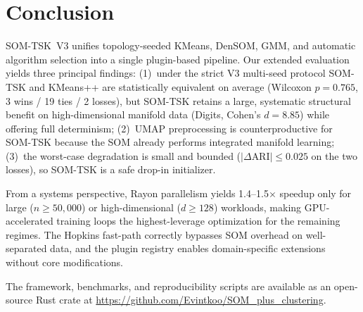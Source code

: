 \documentclass[journal]{IEEEtran}
\begin{document}
\section{Conclusion}
\label{sec:conclusion}

SOM-TSK~V3 unifies topology-seeded KMeans, DenSOM, GMM, and automatic algorithm selection into a single plugin-based pipeline.
Our extended evaluation yields three principal findings:
(1)~under the strict V3 multi-seed protocol SOM-TSK and KMeans++ are statistically equivalent on average (Wilcoxon $p = 0.765$, 3 wins / 19 ties / 2 losses), but SOM-TSK retains a large, systematic structural benefit on high-dimensional manifold data (Digits, Cohen's $d = 8.85$) while offering full determinism;
(2)~UMAP preprocessing is counterproductive for SOM-TSK because the SOM already performs integrated manifold learning;
(3)~the worst-case degradation is small and bounded ($|\Delta\text{ARI}| \le 0.025$ on the two losses), so SOM-TSK is a safe drop-in initializer.

From a systems perspective, Rayon parallelism yields 1.4--1.5$\times$ speedup only for large ($n \ge 50{,}000$) or high-dimensional ($d \ge 128$) workloads, making GPU-accelerated training loops the highest-leverage optimization for the remaining regimes.
The Hopkins fast-path correctly bypasses SOM overhead on well-separated data, and the plugin registry enables domain-specific extensions without core modifications.

The framework, benchmarks, and reproducibility scripts are available as an open-source Rust crate at \url{https://github.com/Evintkoo/SOM_plus_clustering}.
\end{document}
